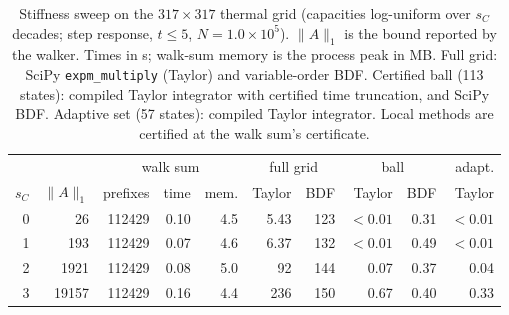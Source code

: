 \begin{table}[t]
\footnotesize\setlength{\tabcolsep}{1.8pt}
\caption{Stiffness sweep on the $317\times317$ thermal grid (capacities log-uniform over $s_C$ decades; step response, $t\le5$, $N=1.0\times10^5$). $\|A\|_1$ is the bound reported by the walker. Times in s; walk-sum memory is the process peak in MB. Full grid: SciPy \texttt{expm\_multiply} (Taylor) and variable-order BDF. Certified ball (113 states): compiled Taylor integrator with certified time truncation, and SciPy BDF. Adaptive set (57 states): compiled Taylor integrator. Local methods are certified at the walk sum's certificate.}\label{tab:stiff}
\begin{ruledtabular}
\begin{tabular}{rr|rrr|rr|rr|r}
 & & \multicolumn{3}{c|}{walk sum} & \multicolumn{2}{c|}{full grid} & \multicolumn{2}{c|}{ball} & adapt.\\
$s_C$ & $\|A\|_1$ & prefixes & time & mem. & Taylor & BDF & Taylor & BDF & Taylor\\\hline
0 & 26 & 112429 & 0.10 & 4.5 & 5.43 & 123 & $<0.01$ & 0.31 & $<0.01$ \\
1 & 193 & 112429 & 0.07 & 4.6 & 6.37 & 132 & $<0.01$ & 0.49 & $<0.01$ \\
2 & 1921 & 112429 & 0.08 & 5.0 & 92 & 144 & 0.07 & 0.37 & 0.04 \\
3 & 19157 & 112429 & 0.16 & 4.4 & 236 & 150 & 0.67 & 0.40 & 0.33 \\
\end{tabular}
\end{ruledtabular}
\end{table}

